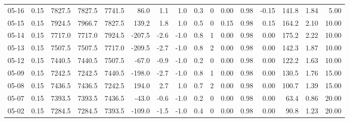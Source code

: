 \begin{threeparttable}
{\begin{tabular}{lrrrrrrrrrrrrrrr}
  05-16 &     0.15 & 7827.5 & 7827.5 & 7741.5 &       86.0 &            1.1 &                      1.0 &                 0.3 &              0 &       0.00 &      0.98 &          -0.15 &            141.8 &            1.84 &                   5.00 \\
  05-15 &     0.15 & 7924.5 & 7966.7 & 7827.5 &      139.2 &            1.8 &                      1.0 &                 0.5 &              0 &       0.15 &      0.98 &           0.15 &            164.2 &            2.10 &                  10.00 \\
  05-14 &     0.15 & 7717.0 & 7717.0 & 7924.5 &     -207.5 &           -2.6 &                     -1.0 &                 0.8 &              1 &       0.00 &      0.98 &           0.00 &            175.2 &            2.22 &                  10.00 \\
  05-13 &     0.15 & 7507.5 & 7507.5 & 7717.0 &     -209.5 &           -2.7 &                     -1.0 &                 0.8 &              2 &       0.00 &      0.98 &           0.00 &            142.3 &            1.87 &                  10.00 \\
  05-12 &     0.15 & 7440.5 & 7440.5 & 7507.5 &      -67.0 &           -0.9 &                     -1.0 &                 0.2 &              0 &       0.00 &      0.98 &           0.00 &            122.2 &            1.63 &                  10.00 \\
  05-09 &     0.15 & 7242.5 & 7242.5 & 7440.5 &     -198.0 &           -2.7 &                     -1.0 &                 0.8 &              1 &       0.00 &      0.98 &           0.00 &            130.5 &            1.76 &                  15.00 \\
  05-08 &     0.15 & 7436.5 & 7436.5 & 7242.5 &      194.0 &            2.7 &                      1.0 &                 0.7 &              2 &       0.00 &      0.98 &           0.00 &            100.7 &            1.39 &                  15.00 \\
  05-07 &     0.15 & 7393.5 & 7393.5 & 7436.5 &      -43.0 &           -0.6 &                     -1.0 &                 0.2 &              0 &       0.00 &      0.98 &           0.00 &             63.4 &            0.86 &                  20.00 \\
  05-02 &     0.15 & 7284.5 & 7284.5 & 7393.5 &     -109.0 &           -1.5 &                     -1.0 &                 0.4 &              0 &       0.00 &      0.98 &           0.00 &             90.8 &            1.23 &                  20.00 \\

\end{tabular}}
\end{threeparttable}
